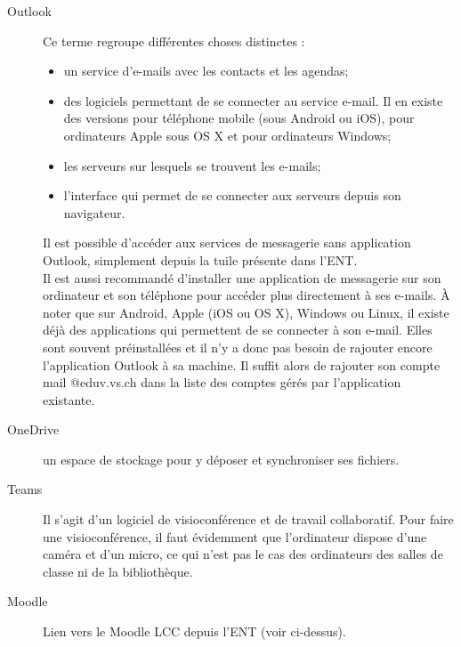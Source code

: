 \documentclass[10pt,a4paper]{report}
\begin{document}
\begin{description}
	\item[Outlook] Ce terme regroupe différentes choses distinctes :
		\begin{itemize}
			\item un service d'e-mails avec les contacts et les agendas;
			\item des logiciels permettant de se connecter au service e-mail. Il en existe des versions pour téléphone mobile (sous Android ou iOS), pour ordinateurs Apple sous OS X et pour ordinateurs Windows;
			\item les serveurs sur lesquels se trouvent les e-mails;
			\item l'interface  qui permet de se connecter aux serveurs depuis son navigateur. 
		\end{itemize}
		Il est possible d'accéder aux services de messagerie sans application Outlook, simplement depuis la tuile présente dans l'ENT. \\
		Il est aussi recommandé d'installer une application de messagerie sur son ordinateur et son téléphone pour accéder plus directement à ses e-mails. À noter que sur Android, Apple (iOS ou OS X), Windows ou Linux, il existe déjà des applications qui permettent de se connecter à son e-mail. Elles sont souvent préinstallées et il n'y a donc pas besoin de rajouter encore l'application Outlook à sa machine. Il suffit alors de rajouter son compte mail @eduv.vs.ch dans la liste des comptes gérés par l'application existante.
	\item[OneDrive] un espace de stockage pour y déposer et synchroniser ses fichiers.
	\item[Teams] Il s'agit d'un logiciel de visioconférence et de travail collaboratif. Pour faire une visioconférence, il faut évidemment que l'ordinateur dispose d'une caméra et d'un micro, ce qui n'est pas le cas des ordinateurs des salles de classe ni de la bibliothèque.
	\item[Moodle] Lien vers le Moodle LCC depuis l'ENT (voir ci-dessus).
\end{description}


\end{document}
